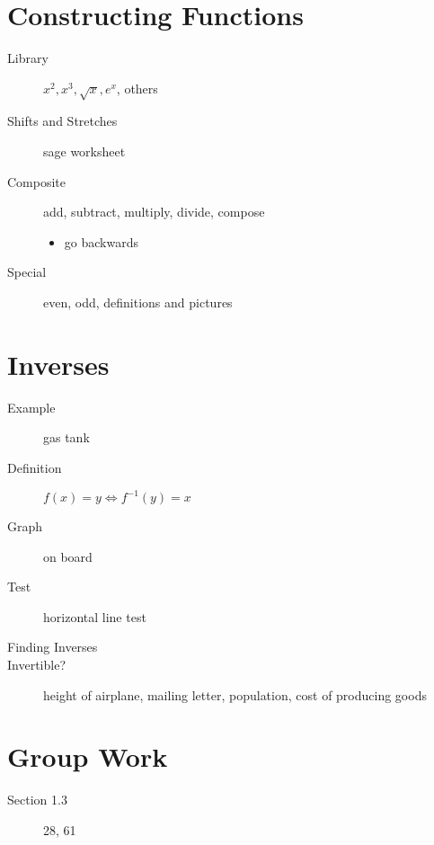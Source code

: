 \documentclass[11pt]{article}
\begin{document}
\drawtitle

\section*{Constructing Functions}
\begin{description}
\item[Library] $x^2, x^3, \sqrt{x}, e^x$, others
\item[Shifts and Stretches] sage worksheet
\item[Composite] add, subtract, multiply, divide, compose
  \begin{itemize}
  \item go backwards
  \end{itemize}
\item[Special] even, odd, definitions and pictures
\end{description}

\section*{Inverses}
\begin{description}
\item[Example] gas tank
\item[Definition] $f(x)=y\Leftrightarrow f^{-1}(y)=x$
\item[Graph] on board
\item[Test] horizontal line test
\item[Finding Inverses]
\item[Invertible?] height of airplane, mailing letter, population,
  cost of producing goods
\end{description}

\section*{Group Work}
\begin{description}
\item[Section 1.3] 28, 61
\end{description}
\end{document}
